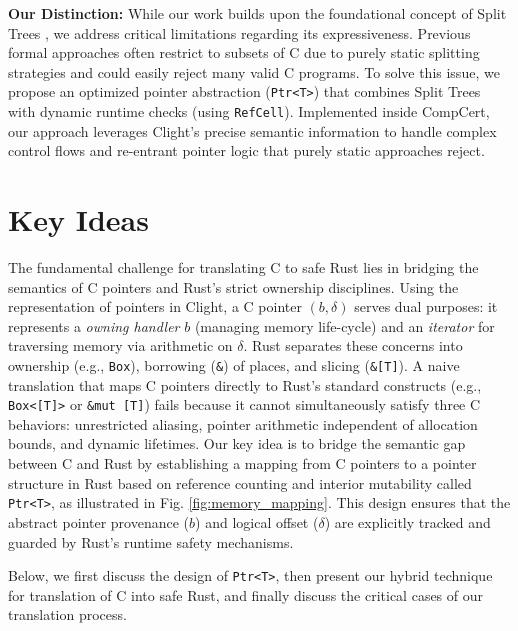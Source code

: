 \documentclass{llncs} %
\begin{document}
\textbf{Our Distinction:} While our work builds upon the foundational concept of Split Trees \cite{Fromherz2024}, we address critical limitations regarding its expressiveness. Previous formal approaches often restrict to subsets of C due to purely static splitting strategies and could easily reject many valid C programs. To solve this issue, we propose an optimized pointer abstraction (\texttt{Ptr<T>}) that combines Split Trees with dynamic runtime checks (using \texttt{RefCell}). Implemented inside CompCert, our approach leverages Clight's precise semantic information to handle complex control flows and re-entrant pointer logic that purely static approaches reject.

\section{Key Ideas}
\label{sec:algorithm}

The fundamental challenge for translating C to safe Rust lies in bridging the semantics of C pointers and Rust's strict ownership disciplines.
%
Using the representation of pointers in Clight, a C pointer $(b, \delta)$ serves dual purposes: it represents a \textit{owning handler} $b$ (managing memory life-cycle) and an \textit{iterator} for traversing memory via arithmetic on $\delta$. Rust separates these concerns into ownership (e.g., \texttt{Box}), borrowing (\texttt{\&}) of places, and slicing (\texttt{\&[T]}). A naive translation that maps C pointers directly to Rust's standard constructs (e.g., \texttt{Box<[T]>} or \texttt{\&mut [T]}) fails because it cannot simultaneously satisfy three C behaviors: unrestricted aliasing, pointer arithmetic independent of allocation bounds, and dynamic lifetimes.
Our key idea is to bridge the semantic gap between C and Rust by establishing a mapping from C pointers to a pointer structure in Rust based on reference counting and interior mutability called \texttt{Ptr<T>}, as illustrated in Fig. \ref{fig:memory_mapping}. This design ensures that the abstract pointer provenance ($b$) and logical offset ($\delta$) are explicitly tracked and guarded by Rust's runtime safety mechanisms.
%

Below, we first discuss the design of \texttt{Ptr<T>}, then present our hybrid technique for translation of C into safe Rust, and finally discuss the critical cases of our translation process.
\end{document}
